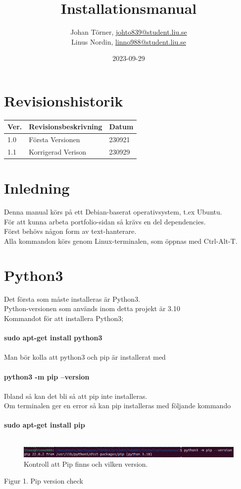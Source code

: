 \documentclass{TDP003mall}
\author{Johan Törner, \url{johto839@student.liu.se}\\
  Linus Nordin, \url{linno988@student.liu.se}\\}
\title{Installationsmanual}
\date{2023-09-29}
\begin{document}
\graphicspath{ {./images/} }

\projectpage
\section{Revisionshistorik}
\begin{table}[!h]
\begin{tabularx}{\linewidth}{|l|X|l|}
\hline
Ver. & Revisionsbeskrivning & Datum \\\hline
1.0 & Första Versionen & 230921 \\\hline
1.1 & Korrigerad Verison & 230929 \\\hline
\end{tabularx}
\end{table}


\section{Inledning}

Denna manual körs på ett Debian-baserat operativsystem, t.ex Ubuntu.\\
För att kunna arbeta portfolio-sidan så krävs en del dependencies.\\
Först behövs någon form av text-hanterare.\\

Alla kommandon körs genom Linux-terminalen, som öppnas med Ctrl-Alt-T.\\



\section{Python3}
Det första som måste installeras är Python3.\\
Python-versionen som används inom detta projekt är 3.10\\ 
Kommandot för att installera Python3;\\\\
\textbf{sudo apt-get install python3}\\\\
Man bör kolla att python3 och pip är installerat med\\\\
\textbf{python3 -m pip --version}\\\\
Ibland så kan det bli så att pip inte installeras.\\
Om terminalen ger en error så kan pip installeras med följande kommando\\\\
\textbf{sudo apt-get install pip}\\\\
\begin{figure}[h]
  \centering
  \includegraphics[scale=0.5]{pip_version}
  \caption{\label{fig:The-caption} Kontroll att Pip finns och vilken version.}
\end{figure}
\caption*{Figur 1. Pip version check}
\end{document}
